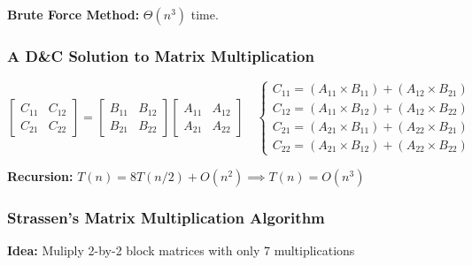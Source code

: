 \documentclass[10pt]{article}
\begin{document}
\textbf{Brute Force Method:} $\Theta (n^3)$ time.

\subsubsection{A D\&C Solution to Matrix Multiplication}

$$
\left[
\begin{matrix}
	C_{11} & C_{12}\\
	C_{21} & C_{22}
\end{matrix}
\right]
=
\left[
\begin{matrix}
	B_{11} & B_{12}\\
	B_{21} & B_{22}
\end{matrix}
\right]
\left[
\begin{matrix}
	A_{11} & A_{12}\\
	A_{21} & A_{22}
\end{matrix}
\right]\quad
\begin{cases}
	C_{11} = (A_{11}\times B_{11}) + (A_{12}\times B_{21})\\
	C_{12} = (A_{11}\times B_{12}) + (A_{12}\times B_{22})\\
	C_{21} = (A_{21}\times B_{11}) + (A_{22}\times B_{21})\\
	C_{22} = (A_{21}\times B_{12}) + (A_{22}\times B_{22})
\end{cases}
$$

\textbf{Recursion:} $T(n) = 8T(n/2) + O(n^2) \implies T(n) = O(n^3)$

\newpage

\subsubsection{Strassen's Matrix Multiplication Algorithm}

\textbf{Idea:} Muliply 2-by-2 block matrices with only 7 multiplications
\end{document}
